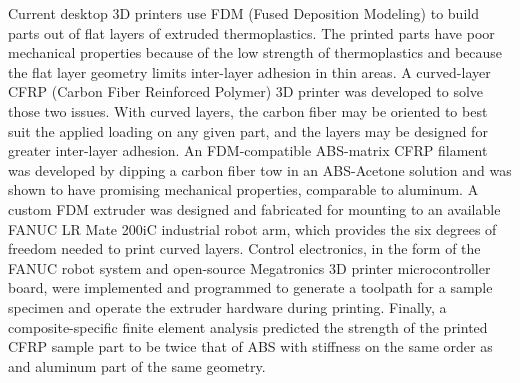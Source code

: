 
Current desktop 3D printers use FDM (Fused Deposition Modeling) to build parts out of flat layers of extruded thermoplastics. The printed parts have poor mechanical properties because of the low strength of thermoplastics and because the flat layer geometry limits inter-layer adhesion in thin areas. A curved-layer CFRP (Carbon Fiber Reinforced Polymer) 3D printer was developed to solve those two issues. With curved layers, the carbon fiber may be oriented to best suit the applied loading on any given part, and the layers may be designed for greater inter-layer adhesion. An FDM-compatible ABS-matrix CFRP filament was developed by dipping a carbon fiber tow in an ABS-Acetone solution and was shown to have promising mechanical properties, comparable to aluminum. A custom FDM extruder was designed and fabricated for mounting to an available FANUC LR Mate 200iC industrial robot arm, which provides the six degrees of freedom needed to print curved layers. Control electronics, in the form of the FANUC robot system and open-source Megatronics 3D printer microcontroller board, were implemented and programmed to generate a toolpath for a sample specimen and operate the extruder hardware during printing. Finally, a composite-specific finite element analysis predicted the strength of the printed CFRP sample part to be twice that of ABS with stiffness on the same order as and aluminum part of the same geometry.